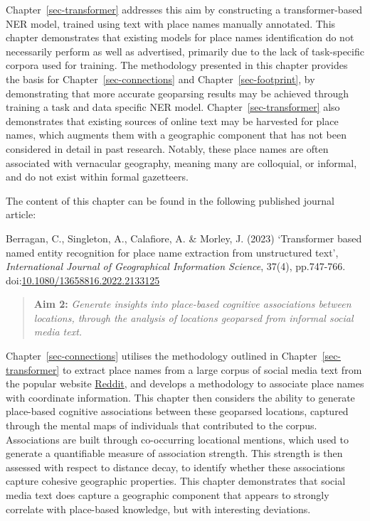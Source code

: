 \documentclass[
  letterpaper,
  11pt,
  english,
  onehalfspacing,
  headsepline]{MastersDoctoralThesis}
\begin{document}
Chapter~\ref{sec-transformer} addresses this aim by constructing a
transformer-based NER model, trained using text with place names
manually annotated. This chapter demonstrates that existing models for
place names identification do not necessarily perform as well as
advertised, primarily due to the lack of task-specific corpora used for
training. The methodology presented in this chapter provides the basis
for Chapter~\ref{sec-connections} and Chapter~\ref{sec-footprint}, by
demonstrating that more accurate geoparsing results may be achieved
through training a task and data specific NER model.
Chapter~\ref{sec-transformer} also demonstrates that existing sources of
online text may be harvested for place names, which augments them with a
geographic component that has not been considered in detail in past
research. Notably, these place names are often associated with
vernacular geography, meaning many are colloquial, or informal, and do
not exist within formal gazetteers.

The content of this chapter can be found in the following published
journal article:

Berragan, C., Singleton, A., Calafiore, A. \& Morley, J. (2023)
`Transformer based named entity recognition for place name extraction
from unstructured text', \emph{International Journal of Geographical
Information Science}, 37(4), pp.747-766.
doi:\href{https://doi.org/10.1080/13658816.2022.2133125}{10.1080/13658816.2022.2133125}

\begin{quote}
\textbf{Aim 2:} \emph{Generate insights into place-based cognitive
associations between locations, through the analysis of locations
geoparsed from informal social media text.}
\end{quote}

Chapter~\ref{sec-connections} utilises the methodology outlined in
Chapter~\ref{sec-transformer} to extract place names from a large corpus
of social media text from the popular website
\href{https://reddit.com}{Reddit}, and develops a methodology to
associate place names with coordinate information. This chapter then
considers the ability to generate place-based cognitive associations
between these geoparsed locations, captured through the mental maps of
individuals that contributed to the corpus. Associations are built
through co-occurring locational mentions, which used to generate a
quantifiable measure of association strength. This strength is then
assessed with respect to distance decay, to identify whether these
associations capture cohesive geographic properties. This chapter
demonstrates that social media text does capture a geographic component
that appears to strongly correlate with place-based knowledge, but with
interesting deviations.
\end{document}

